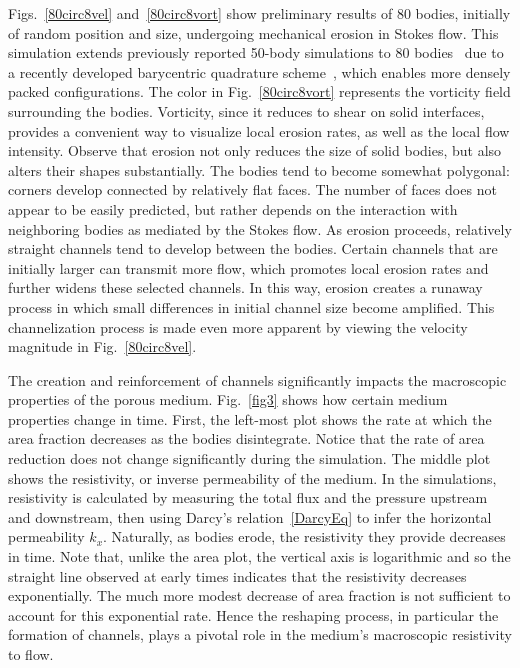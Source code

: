 \documentclass[11pt]{article}
\begin{document}
Figs.~\ref{80circ8vel} and~\ref{80circ8vort} show preliminary results of 80 bodies, initially of random position and size, undergoing mechanical erosion in Stokes flow. This simulation extends previously reported 50-body simulations to 80 bodies~\cite{Quaife2018} due to a recently developed barycentric quadrature scheme~\cite{bar2014, bar-wu-vee2015, chi-moo-qua2019}, which enables more densely packed configurations. The color in Fig.~\ref{80circ8vort} represents the vorticity field surrounding the bodies. Vorticity, since it reduces to shear on solid interfaces, provides a convenient way to visualize local erosion rates, as well as the local flow intensity.  Observe that erosion not only reduces the size of solid bodies, but also alters their shapes substantially. The bodies tend to become somewhat polygonal: corners develop connected by relatively flat faces. The number of faces does not appear to be easily predicted, but rather depends on the interaction with neighboring bodies as mediated by the Stokes flow. As erosion proceeds, relatively straight channels tend to develop between the bodies. Certain channels that are initially larger can transmit more flow, which promotes local erosion rates and further widens these selected channels. In this way, erosion creates a runaway process in which small differences in initial channel size become amplified. This channelization process is made even more apparent by viewing the velocity magnitude in Fig.~\ref{80circ8vel}.
 
The creation and reinforcement of channels significantly impacts the macroscopic properties of the porous medium. Fig.~\ref{fig3} shows how certain medium properties change in time. First, the left-most plot shows the rate at which the area fraction decreases as the bodies disintegrate. Notice that the rate of area reduction does not change significantly during the simulation. The middle plot shows the resistivity, or inverse permeability of the medium. In the simulations, resistivity is calculated by measuring the total flux and the pressure upstream and downstream, then using Darcy's relation~\eqref{DarcyEq} to infer the horizontal permeability $k_x$. Naturally, as bodies erode, the resistivity they provide decreases in time. Note that, unlike the area plot, the vertical axis is logarithmic and so the straight line observed at early times indicates that the resistivity decreases exponentially.  The much more modest decrease of area fraction is not sufficient to account for this exponential rate. Hence the reshaping process, in particular the formation of channels, plays a pivotal role in the medium's macroscopic resistivity to flow.  
\end{document}
